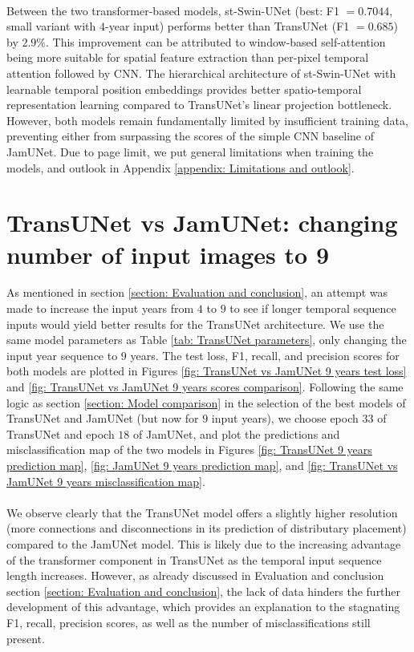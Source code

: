 \documentclass[10pt,oneside,a4paper,english]{article}
\begin{document}
\\
Between the two transformer-based models, st-Swin-UNet (best: F1 $= 0.7044$, small variant with $4$-year input) performs better than TransUNet (F1 $= 0.685$) by $2.9\%$. This improvement can be attributed to window-based self-attention being more suitable for spatial feature extraction than per-pixel temporal attention followed by CNN. The hierarchical architecture of st-Swin-UNet with learnable temporal position embeddings provides better spatio-temporal representation learning compared to TransUNet's linear projection bottleneck. However, both models remain fundamentally limited by insufficient training data, preventing either from surpassing the scores of the simple CNN baseline of JamUNet. Due to page limit, we put general limitations when training the models, and outlook in Appendix \ref{appendix: Limitations and outlook}.


\newpage



\newpage
\appendix


\section{TransUNet vs JamUNet: changing number of input images to 9} \label{appendix: TransUNet 9 years}
As mentioned in section \ref{section: Evaluation and conclusion}, an attempt was made to increase the input years from $4$ to $9$ to see if longer temporal sequence inputs would yield better results for the TransUNet architecture. We use the same model parameters as Table \ref{tab: TransUNet parameters}, only changing the input year sequence to $9$ years. The test loss, F1, recall, and precision scores for both models are plotted in Figures \ref{fig: TransUNet vs JamUNet 9 years test loss} and \ref{fig: TransUNet vs JamUNet 9 years scores comparison}. Following the same logic as section \ref{section: Model comparison} in the selection of the best models of TransUNet and JamUNet (but now for $9$ input years), we choose epoch $33$ of TransUNet and epoch $18$ of JamUNet, and plot the predictions and misclassification map of the two models in Figures \ref{fig: TransUNet 9 years prediction map}, \ref{fig: JamUNet 9 years prediction map}, and \ref{fig: TransUNet vs JamUNet 9 years misclassification map}. \\
\\
We observe clearly that the TransUNet model offers a slightly higher resolution (more connections and disconnections in its prediction of distributary placement) compared to the JamUNet model. This is likely due to the increasing advantage of the transformer component in TransUNet as the temporal input sequence length increases. However, as already discussed in Evaluation and conclusion section \ref{section: Evaluation and conclusion}, the lack of data hinders the further development of this advantage, which provides an explanation to the stagnating F1, recall, precision scores, as well as the number of misclassifications still present.
\end{document}
